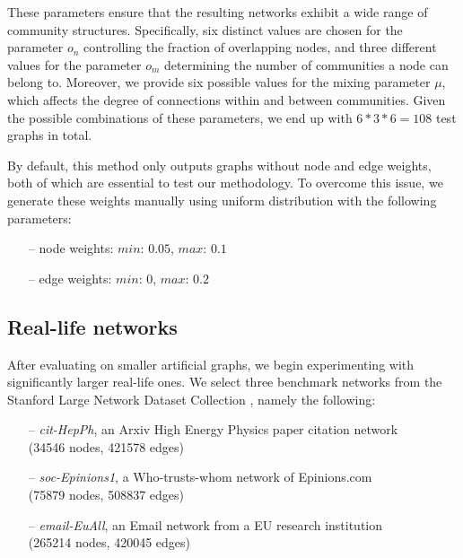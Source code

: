 \documentclass[pdflatex,sn-mathphys-ay]{sn-jnl}
\begin{document}
These parameters ensure that the resulting networks exhibit a wide range of community structures. Specifically, six distinct values are chosen for the parameter $o_n$ controlling the fraction of overlapping nodes, and three different values for the parameter $o_m$ determining the number of communities a node can belong to. Moreover, we provide six possible values for the mixing parameter $\mu$, which affects the degree of connections within and between communities. Given the possible combinations of these parameters, we end up with $6*3*6 = 108$ test graphs in total.

By default, this method only outputs graphs without node and edge weights, both of which are essential to test our methodology. To overcome this issue, we generate these weights manually using uniform distribution with the following parameters:

\begin{itemize}
\item[--] node weights: $min$: $0.05$, $max$: $0.1$
\item[--] edge weights: $min$: $0$, $max$: $0.2$
\end{itemize}


\subsection{Real-life networks}\label{subsec_reallife}

After evaluating on smaller artificial graphs, we begin experimenting with significantly larger real-life ones. We select three benchmark networks from the Stanford Large Network Dataset Collection \citep{stanfordlarge}, namely the following:

\begin{itemize}
\setlength\itemsep{0.5em}
\item[--] \textit{cit-HepPh}, an Arxiv High Energy Physics paper citation network\\
(34546 nodes, 421578 edges)
\item[--] \textit{soc-Epinions1}, a Who-trusts-whom network of Epinions.com\\
(75879 nodes, 508837 edges)
\item[--] \textit{email-EuAll}, an Email network from a EU research institution\\
(265214 nodes, 420045 edges)
\end{itemize}
\end{document}
